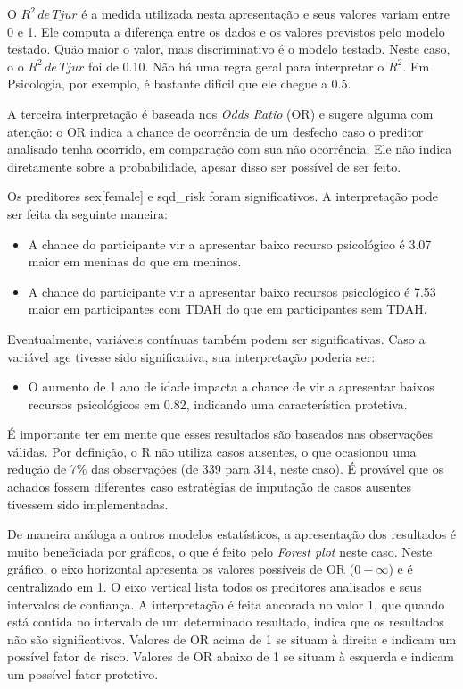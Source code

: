 \documentclass[
]{book}
\providecommand{\tightlist}{%
  \setlength{\itemsep}{0pt}\setlength{\parskip}{0pt}}
\begin{document}
O \(R^2 \, de \, Tjur\) é a medida utilizada nesta apresentação e seus valores variam entre 0 e 1. Ele computa a diferença entre os dados e os valores previstos pelo modelo testado. Quão maior o valor, mais discriminativo é o modelo testado. Neste caso, o o \(R^2 \, de \, Tjur\) foi de 0.10. Não há uma regra geral para interpretar o \(R^2\). Em Psicologia, por exemplo, é bastante difícil que ele chegue a 0.5.

A terceira interpretação é baseada nos \emph{Odds Ratio} (OR) e sugere alguma com atenção: o OR indica a chance de ocorrência de um desfecho caso o preditor analisado tenha ocorrido, em comparação com sua não ocorrência. Ele não indica diretamente sobre a probabilidade, apesar disso ser possível de ser feito.

Os preditores sex{[}female{]} e sqd\_risk foram significativos. A interpretação pode ser feita da seguinte maneira:

\begin{itemize}
\tightlist
\item
  A chance do participante vir a apresentar baixo recurso psicológico é 3.07 maior em meninas do que em meninos.
\item
  A chance do participante vir a apresentar baixo recursos psicológico é 7.53 maior em participantes com TDAH do que em participantes sem TDAH.
\end{itemize}

Eventualmente, variáveis contínuas também podem ser significativas. Caso a variável age tivesse sido significativa, sua interpretação poderia ser:

\begin{itemize}
\tightlist
\item
  O aumento de 1 ano de idade impacta a chance de vir a apresentar baixos recursos psicológicos em 0.82, indicando uma característica protetiva.
\end{itemize}

É importante ter em mente que esses resultados são baseados nas observações válidas. Por definição, o R não utiliza casos ausentes, o que ocasionou uma redução de 7\% das observações (de 339 para 314, neste caso). É provável que os achados fossem diferentes caso estratégias de imputação de casos ausentes tivessem sido implementadas.

De maneira análoga a outros modelos estatísticos, a apresentação dos resultados é muito beneficiada por gráficos, o que é feito pelo \emph{Forest plot} neste caso. Neste gráfico, o eixo horizontal apresenta os valores possíveis de OR (\(0-\infty\)) e é centralizado em 1. O eixo vertical lista todos os preditores analisados e seus intervalos de confiança. A interpretação é feita ancorada no valor 1, que quando está contida no intervalo de um determinado resultado, indica que os resultados não são significativos. Valores de OR acima de 1 se situam à direita e indicam um possível fator de risco. Valores de OR abaixo de 1 se situam à esquerda e indicam um possível fator protetivo.
\end{document}
